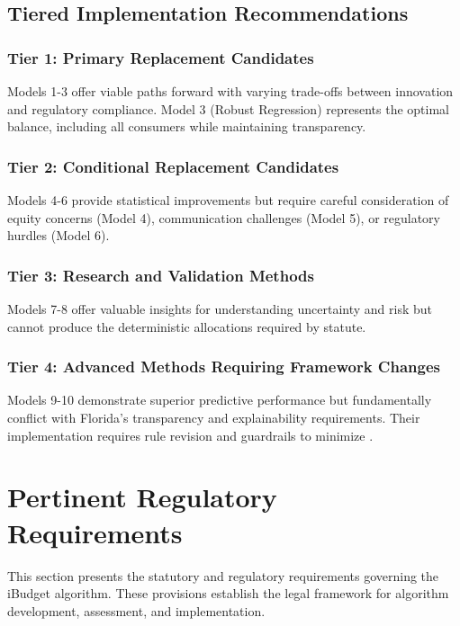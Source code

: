 \subsection{Tiered Implementation Recommendations}

\subsubsection{Tier 1: Primary Replacement Candidates}
Models 1-3 offer viable paths forward with varying trade-offs between innovation and regulatory compliance. Model 3 (Robust Regression) represents the optimal balance, including all consumers while maintaining transparency.

\subsubsection{Tier 2: Conditional Replacement Candidates}
Models 4-6 provide statistical improvements but require careful consideration of equity concerns (Model 4), communication challenges (Model 5), or regulatory hurdles (Model 6).

\subsubsection{Tier 3: Research and Validation Methods}
Models 7-8 offer valuable insights for understanding uncertainty and risk but cannot produce the deterministic allocations required by statute.

\subsubsection{Tier 4: Advanced Methods Requiring Framework Changes}
Models 9-10 demonstrate superior predictive performance but fundamentally conflict with Florida's transparency and explainability requirements. Their implementation requires rule revision and guardrails to minimize .

\section{Pertinent Regulatory Requirements}

This section presents the statutory and regulatory requirements governing the iBudget algorithm. These provisions establish the legal framework for algorithm development, assessment, and implementation.

